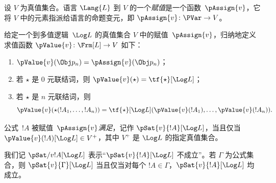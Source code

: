 \documentclass[../../../include/open-logic-section]{subfiles}
\begin{document}


\begin{defn}[赋值]
设 $V$ 为真值集合。语言 $\Lang{L}$ 到 $V$ 的一个\emph{赋值}是一个函数~$\pAssign{v}$，它将 $V$ 中的元素指派给语言的命题变元，即 $\pAssign{v} \colon \PVar \to V$。
\end{defn}

\begin{defn}
  给定一个到多值逻辑~$\Log L$ 的真值集合 $V$ 中的赋值~$\pAssign{v}$，归纳地定义求值函数 $\pValue{v} \colon \Frm[L] \to V$ 如下：
  \begin{enumerate}
    \item $\pValue{v}(\Obj p_n) = \pAssign{v}(\Obj p_n)$；
    \item 若 $\star$ 是 $0$ 元联结词，则 $\pValue{v}(\star)  = \tf{\star}[\Log L]$；
    \item 若 $\star$ 是 $n$ 元联结词，则 \[
      \pValue{v}(\star(!A_1, \dots, !A_n)) = \tf{\star}[\Log L]
      (\pValue{v}(!A_1), \dots, \pValue{v}(!A_n)).
    \]
  \end{enumerate}
\end{defn}

\begin{defn}[满足]
 公式~$!A$ 被赋值~$\pAssign{v}$\emph{满足}，记作 $\pSat{v}{!A}[\Log L]$，当且仅当 $\pValue{v}(!A)[\Log L] \in V^+$，其中 $V^+$ 是 $\Log L$ 的指定真值集合。

我们记 $\pSat/{v}{!A}[\Log L]$ 表示“$\pSat{v}{!A}[\Log
  L]$ 不成立”。若 $\Gamma$ 为公式集合，则 $\pSat{v}{\Gamma}[\Log
  L]$ 当且仅当对每个 $!A \in \Gamma$，$\pSat{v}{!A}[\Log L]$ 均成立。
\end{defn}
\end{document}
